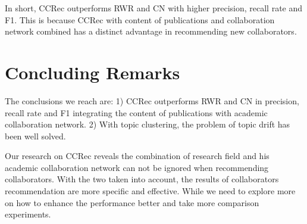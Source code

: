 \documentclass{chi-ext}
\begin{document}
In short, CCRec outperforms RWR and CN with higher precision, recall rate and F1. This is because CCRec with content of publications and collaboration network combined has a distinct advantage in recommending new collaborators.

\section{Concluding Remarks}
The conclusions we reach are: 1) CCRec outperforms RWR and CN in precision, recall rate and F1 integrating the content of publications with academic collaboration network. 2) With topic clustering, the problem of topic drift has been well solved.

Our research on CCRec reveals the combination of research field and his academic collaboration network can not be ignored when recommending collaborators. With the two taken into account, the results of collaborators recommendation are more specific and effective. While we need to explore more on how to enhance the performance better and take more comparison experiments.


\balance


\end{document}
